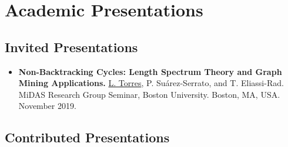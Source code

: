 \documentclass[12pt,]{scrartcl}
\newenvironment{myitemize}
{ \begin{itemize}
    \setlength{\itemsep}{5pt}
    \setlength{\parskip}{0pt}
    \setlength{\parsep}{0pt}     }
{ \end{itemize}                  }
\begin{document}
\section{Academic Presentations}\label{presentations}

\subsection{Invited Presentations}\label{invited-presentations}

\begin{myitemize}
\leftskip-0.25in %

\item \textbf{Non-Backtracking Cycles: Length Spectrum Theory and Graph Mining Applications.} \underline{L. Torres}, P. Su\'arez-Serrato, and T. Eliassi-Rad. MiDAS Research Group Seminar, Boston University. Boston, MA, USA. November 2019.

\end{myitemize}

\subsection{Contributed Presentations}\label{contributed-presentations}
\end{document}
